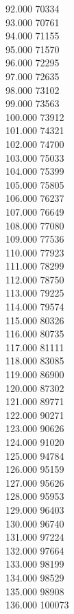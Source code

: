 { 92.000	70334 \\
 93.000	70761 \\
 94.000	71155 \\
 95.000	71570 \\
 96.000	72295 \\
 97.000	72635 \\
 98.000	73102 \\
 99.000	73563 \\
 100.000	73912 \\
 101.000	74321 \\
 102.000	74700 \\
 103.000	75033 \\
 104.000	75399 \\
 105.000	75805 \\
 106.000	76237 \\
 107.000	76649 \\
 108.000	77080 \\
 109.000	77536 \\
 110.000	77923 \\
 111.000	78299 \\
 112.000	78750 \\
 113.000	79225 \\
 114.000	79574 \\
 115.000	80326 \\
 116.000	80735 \\
 117.000	81111 \\
 118.000	83085 \\
 119.000	86900 \\
 120.000	87302 \\
 121.000	89771 \\
 122.000	90271 \\
 123.000	90626 \\
 124.000	91020 \\
 125.000	94784 \\
 126.000	95159 \\
 127.000	95626 \\
 128.000	95953 \\
 129.000	96403 \\
 130.000	96740 \\
 131.000	97224 \\
 132.000	97664 \\
 133.000	98199 \\
 134.000	98529 \\
 135.000	98908 \\
 136.000	100073 \\
}

